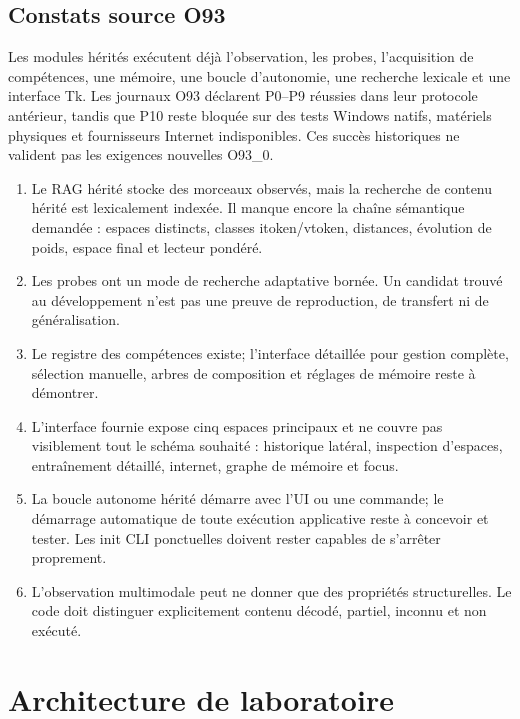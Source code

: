 \documentclass[11pt,a4paper]{report}
\begin{document}
\section{Constats source O93}Les modules hérités exécutent déjà l'observation, les probes, l'acquisition de compétences, une mémoire, une boucle d'autonomie, une recherche lexicale et une interface Tk. Les journaux O93 déclarent P0--P9 réussies dans leur protocole antérieur, tandis que P10 reste bloquée sur des tests Windows natifs, matériels physiques et fournisseurs Internet indisponibles. Ces succès historiques ne valident pas les exigences nouvelles O93\_0.
\begin{enumerate}
\item Le RAG hérité stocke des morceaux observés, mais la recherche de contenu hérité est lexicalement indexée. Il manque encore la chaîne sémantique demandée : espaces distincts, classes itoken/vtoken, distances, évolution de poids, espace final et lecteur pondéré.
\item Les probes ont un mode de recherche adaptative bornée. Un candidat trouvé au développement n'est pas une preuve de reproduction, de transfert ni de généralisation.
\item Le registre des compétences existe; l'interface détaillée pour gestion complète, sélection manuelle, arbres de composition et réglages de mémoire reste à démontrer.
\item L'interface fournie expose cinq espaces principaux et ne couvre pas visiblement tout le schéma souhaité : historique latéral, inspection d'espaces, entraînement détaillé, internet, graphe de mémoire et focus.
\item La boucle autonome hérité démarre avec l'UI ou une commande; le démarrage automatique de toute exécution applicative reste à concevoir et tester. Les init CLI ponctuelles doivent rester capables de s'arrêter proprement.
\item L'observation multimodale peut ne donner que des propriétés structurelles. Le code doit distinguer explicitement contenu décodé, partiel, inconnu et non exécuté.
\end{enumerate}
\chapter{Architecture de laboratoire}
\end{document}
